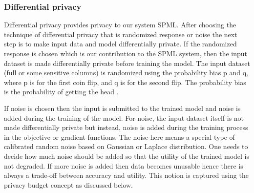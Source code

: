 \subsubsection{Differential privacy}
Differential privacy provides privacy to our system SPML. After choosing the technique of differential privacy that is randomized response or noise the next step is to make input data and model differentially private. If the randomized response is chosen which is our contribution to the SPML system, then the input dataset is made differentially private before training the model. The input dataset (full or some sensitive columns) is randomized using the probability bias p and q, where p is for the first coin flip, and q is for the second flip. The probability bias is the probability of getting the head \cite{14}. 

If noise is chosen then the input is submitted to the trained model and noise is added during the training of the model. For noise, the input dataset itself is not made differentially private but instead, noise is added during the training process in the objective or gradient functions. The noise here means a special type of calibrated random noise based on Gaussian or Laplace distribution. One needs to decide how much noise should be added so that the utility of the trained model is not degraded. If more noise is added then data becomes unusable hence there is always a trade-off between accuracy and utility. This notion is captured using the privacy budget concept as discussed below.

